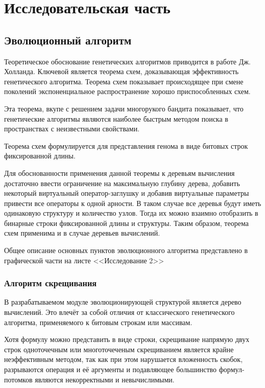 \section{Исследовательская часть}

\subsection{Эволюционный алгоритм}

Теоретическое обоснование генетических алгоритмов приводится в работе Дж. Холланда. 
Ключевой является теорема схем, доказывающая эффективность генетического алгоритма. Теорема схем показывает происходящее при смене поколений экспоненциальное распространение хорошо приспособленных схем.

Эта теорема, вкупе с решением задачи многорукого бандита показывает, что генетические алгоритмы являются наиболее быстрым методом поиска в пространствах с неизвестными свойствами.

Теорема схем формулируется для представления генома в виде битовых строк фиксированной длины.

Для обоснованности применения данной теоремы к деревьям вычисления достаточно ввести ограничение на максимальную глубину дерева, добавить некоторый виртуальный оператор-заглушку и добавив виртуальные параметры привести все операторы к одной арности. В таком случае все деревья будут иметь одинаковую структуру и количество узлов. Тогда их можно взаимно отобразить в бинарные строки фиксированной длины и структуры. Таким образом, теорема схем применима и в случае деревьев вычислений.

Общее описание основных пунктов эволюционного алгоритма представлено в графической части на листе <<Исследование 2>>



\clearpage
\subsubsection{Алгоритм скрещивания} \label{sssec:crossover}
В разрабатываемом модуле эволюционирующей структурой является дерево вычислений. Это влечёт за собой отличия от классического генетического алгоритма, применяемого к битовым строкам или массивам.

Хотя формулу можно представить в виде строки, скрещивание напрямую двух строк одноточечным или многоточеченым скрещиванием является крайне неэффективным методом, так как при этом нарушается вложенность скобок, разрываются операция и её аргументы и подавляющее большинство формул-потомков являются некорректными и невычислимыми.

